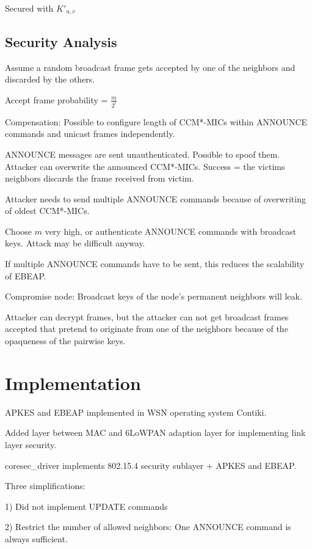 \documentclass[10pt]{article}
\begin{document}
Secured with $K'_{u,v}$


\subsection{Security Analysis}

\noindent

Assume a random broadcast frame gets accepted by one of the neighbors and discarded by the others.

Accept frame probability = $\frac{m}{2^l}$

Compensation: Possible to configure length of CCM*-MICs within ANNOUNCE commands and unicast frames independently.

ANNOUNCE messages are sent unauthenticated. Possible to spoof them. Attacker can overwrite the announced CCM*-MICs. Success = the victims neighbors discards the frame received from victim.

Attacker needs to send multiple ANNOUNCE commands because of overwriting of oldest CCM*-MICs.

Choose $m$ very high, or authenticate ANNOUNCE commands with broadcast keys. Attack may be difficult anyway.

If multiple ANNOUNCE commands have to be sent, this reduces the scalability of EBEAP.

Compromise node: Broadcast keys of the node's permanent neighbors will leak.

Attacker can decrypt frames, but the attacker can not get broadcast frames accepted that pretend to originate from one of the neighbors because of the opaqueness of the pairwise keys. 


\section{Implementation}

\noindent

APKES and EBEAP implemented in WSN operating system Contiki.

Added layer between MAC and 6LoWPAN adaption layer for implementing link layer security.

coresec\_driver implements 802.15.4 security sublayer + APKES and EBEAP.

Three simplifications:

1) Did not implement UPDATE commands

2) Restrict the number of allowed neighbors: One ANNOUNCE command is always sufficient.
\end{document}
